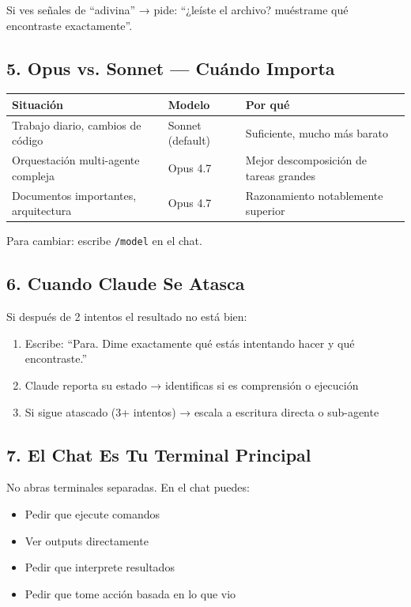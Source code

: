 \documentclass[11pt,a4paper,spanish]{article}
\begin{document}
Si ves señales de ``adivina'' → pide: ``¿leíste el archivo? muéstrame qué encontraste exactamente''.

\subsection*{5. Opus vs. Sonnet — Cuándo Importa}

\begin{tabular}{|p{3cm}|p{2cm}|p{3.5cm}|}
\hline
\textbf{Situación} & \textbf{Modelo} & \textbf{Por qué} \\
\hline
Trabajo diario, cambios de código & Sonnet (default) & Suficiente, mucho más barato \\
Orquestación multi-agente compleja & Opus 4.7 & Mejor descomposición de tareas grandes \\
Documentos importantes, arquitectura & Opus 4.7 & Razonamiento notablemente superior \\
\hline
\end{tabular}

Para cambiar: escribe \texttt{/model} en el chat.

\subsection*{6. Cuando Claude Se Atasca}

Si después de 2 intentos el resultado no está bien:

\begin{enumerate}
  \item Escribe: ``Para. Dime exactamente qué estás intentando hacer y qué encontraste.''
  \item Claude reporta su estado → identificas si es comprensión o ejecución
  \item Si sigue atascado (3+ intentos) → escala a escritura directa o sub-agente
\end{enumerate}

\subsection*{7. El Chat Es Tu Terminal Principal}

No abras terminales separadas. En el chat puedes:
\begin{itemize}
  \item Pedir que ejecute comandos
  \item Ver outputs directamente
  \item Pedir que interprete resultados
  \item Pedir que tome acción basada en lo que vio
\end{itemize}
\end{document}
